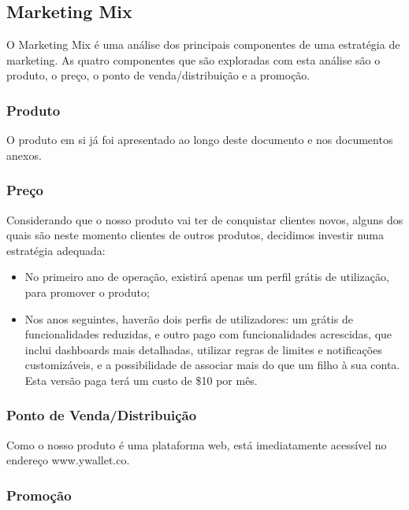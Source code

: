 \documentclass[12pt,a4paper]{article}
\begin{document}
\subsection{Marketing Mix}
\label{subsec:marketing_mix}

O Marketing Mix é uma análise dos principais componentes de uma estratégia de marketing. As quatro componentes que são exploradas com esta análise são o produto, o preço, o ponto de venda/distribuição e a promoção.

\subsubsection{Produto}
\label{subsubsec:produto}

O produto em si já foi apresentado ao longo deste documento e nos documentos anexos.

\subsubsection{Preço}
\label{subsubsec:preco}

Considerando que o nosso produto vai ter de conquistar clientes novos, alguns dos quais são neste momento clientes de outros produtos, decidimos investir numa estratégia adequada:

\begin{itemize}
\item No primeiro ano de operação, existirá apenas um perfil grátis de utilização, para promover o produto;
\item Nos anos seguintes, haverão dois perfis de utilizadores: um grátis de funcionalidades reduzidas, e outro pago com funcionalidades acrescidas, que inclui dashboards mais detalhadas, utilizar regras de limites e notificações customizáveis, e a possibilidade de associar mais do que um filho à sua conta. Esta versão paga terá um custo de \$10 por mês.
\end{itemize}

\subsubsection{Ponto de Venda/Distribuição}
\label{subsubsec:ponto_de_venda/distribuicao}

Como o nosso produto é uma plataforma web, está imediatamente acessível no endereço www.ywallet.co.

\subsubsection{Promoção}
\label{subsubsec:promocao}
\end{document}
